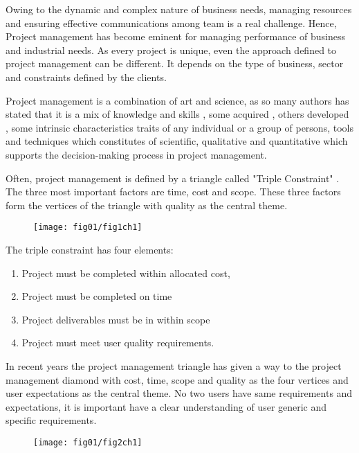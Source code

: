 Owing to the dynamic and complex nature of business needs, managing resources and ensuring effective communications among team is a real challenge. Hence, Project management has become eminent for managing performance of business and industrial needs.
As every project is unique, even the approach defined to project management can be different. It depends on the type of business, sector and constraints defined by the clients. 
 
Project management \cite{activecolab} is a combination of art and science, as so many authors has stated that it is a mix of knowledge and skills , some acquired , others developed , some intrinsic characteristics traits of any individual or a group of persons, tools and techniques which constitutes of scientific, qualitative and quantitative which supports the decision-making process in project management.

Often, project management is defined by a triangle called "Triple Constraint" \cite{Baratta}. The three most important factors are time, cost and scope. These three factors form the vertices of the triangle with quality as the central theme. 


\begin{figure}
\centering
  \texttt{[image: fig01/fig1ch1]}
 \end{figure}

The triple constraint has four elements:
\begin{enumerate}
    \item Project must be completed within allocated cost,
    \item Project must be completed on time 
    \item Project deliverables must be in within scope
    \item Project must meet user quality requirements.
\end{enumerate}
In recent years the project management triangle has given a way to the project management diamond \cite{Shenhar} with cost, time, scope and quality as the four vertices and user expectations as the central theme. No two users have same requirements and expectations, it is important have a clear understanding of user generic and specific requirements. 



 \begin{figure}
\centering
  \texttt{[image: fig01/fig2ch1]}
 \end{figure}

